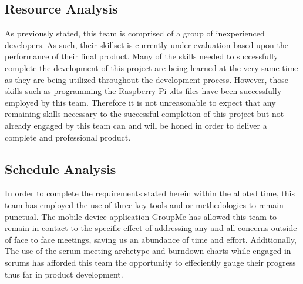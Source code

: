 \subsection{Resource Analysis}
As previously stated, this team is comprised of a group of inexperienced developers. As such, their skillset is currently under evaluation based upon the performance of their final product. Many of the skills needed to successfully complete the development of this project are being learned at the very same time as they are being utilized throughout the development process. However, those skills such as programming the Raspberry Pi .dts files have been successfully employed by this team. Therefore it is not unreasonable to expect that any remaining skills necessary to the successful completion of this project but not already engaged by this team can and will be honed in order to deliver a complete and professional product.
\subsection{Schedule Analysis}
In order to complete the requirements stated herein within the alloted time, this team has employed the use of three key tools and or methedologies to remain punctual. The mobile device application GroupMe has allowed this team to remain in contact to the specific effect of addressing any and all concerns outside of face to face meetings, saving us an abundance of time and effort. Additionally, The use of the scrum meeting archetype and burndown charts while engaged in scrums has afforded this team the opportunity to effeciently gauge their progress thus far in product development.
